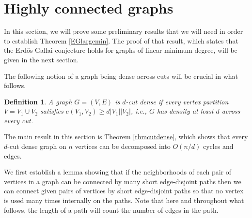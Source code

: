 \documentclass[11pt]{article}
\newtheorem{definition}{Definition}
\begin{document}
\section{Highly connected graphs}
\label{sectcutdense}

In this section, we will prove some preliminary results that we will need in order to establish Theorem \ref{EGlargemin}. The proof of that result, which states that the Erd\H{o}s-Gallai conjecture holds for graphs of linear minimum degree, will be given in the next section.

The following notion of a graph being dense across cuts will be crucial in what follows.

\begin{definition} \label{defdense1}
A graph $G=(V,E)$ is {\it $d$-cut dense} if every vertex partition $V=V_1 \cup V_2$ satisfies $e(V_1,V_2) \geq d|V_1||V_2|$, i.e., $G$ has density at least $d$ across every cut.
\end{definition}

The main result in this section is Theorem \ref{thmcutdense}, which shows that every $d$-cut dense graph on $n$ vertices can be decomposed into $O(n/d)$ cycles and edges.

We first establish a lemma showing that if the neighborhoods of each pair of vertices in a graph can be connected by many short edge-disjoint paths then we can connect given pairs of vertices by short edge-disjoint paths so that no vertex is used many times internally on the paths. Note that here and throughout what follows, the length of a path will count the number of edges in the path.
\end{document}

